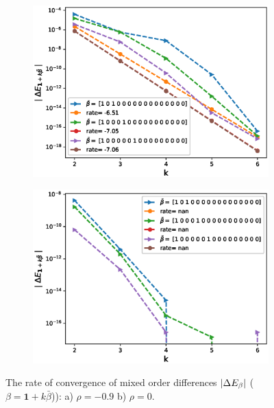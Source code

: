 \documentclass[11pt]{article}
\begin{document}
\begin{figure}[h!]
\centering
\begin{subfigure}{.5\textwidth}
\centering
\includegraphics[width=1\linewidth]{./figures/effect_rho_differences/H_0_43_K_1/N_8/mixed_difference_order2_rbergomi_8steps_H_043_K_1_rho__0_9_with_rate_W1}
\caption{}
\label{fig:sub3}
\end{subfigure}%
\begin{subfigure}{.5\textwidth}
\centering
\includegraphics[width=1\linewidth]{./figures/effect_rho_differences/H_0_43_K_1/N_8/mixed_difference_order2_rbergomi_8steps_H_043_K_1_rho_0_with_rate_W1}
\caption{}
\label{fig:sub4}
\end{subfigure}

\caption{The rate of convergence of  mixed order differences $\left\lvert\Delta E_{\beta}\right\rvert$ ($\beta=\mathbf{1}+k \bar{\beta}$)): a) $\rho=-0.9$ b)  $\rho=0.$}
\label{fig:test2}
\end{figure}
\end{document}
